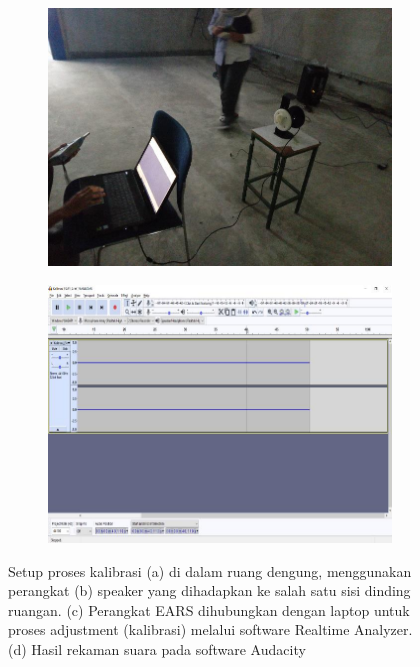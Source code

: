\documentclass{article}
\begin{document}
\begin{figure}[H]
\begin{subfigure}[]{.45\textwidth}
			\caption{}
		\end{subfigure}
		\begin{subfigure}[]{.45\textwidth}
			\includegraphics[width=\textwidth]{images/dengung/ear_sim}
			\caption{}
		\end{subfigure}
		\begin{subfigure}[]{.45\textwidth}
			\includegraphics[width=\textwidth]{images/dengung/audacity}
			\caption{}
		\end{subfigure}
		\caption{Setup proses kalibrasi (a) di dalam ruang dengung, menggunakan perangkat (b) speaker yang
			dihadapkan ke salah satu sisi dinding ruangan. (c) Perangkat EARS dihubungkan dengan laptop untuk proses
			adjustment (kalibrasi) melalui software Realtime Analyzer. (d) Hasil rekaman suara pada software Audacity}
		\label{fig:Setup Kalibrasi Ruang Dengung}
	\end{figure}
\end{document}
